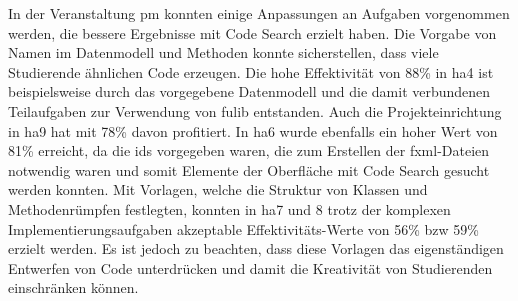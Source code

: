 In der Veranstaltung \ac{pm} konnten einige Anpassungen an Aufgaben vorgenommen werden, die bessere Ergebnisse mit Code Search erzielt haben.
Die Vorgabe von Namen im Datenmodell und Methoden konnte sicherstellen, dass viele Studierende ähnlichen Code erzeugen.
Die hohe Effektivität von 88\% in \ac{ha}4 ist beispielsweise durch das vorgegebene Datenmodell und die damit verbundenen Teilaufgaben zur Verwendung von fulib entstanden.
Auch die Projekteinrichtung in \ac{ha}9 hat mit 78\% davon profitiert.
In \ac{ha}6 wurde ebenfalls ein hoher Wert von 81\% erreicht, da die \acp{id} vorgegeben waren, die zum Erstellen der \ac{fxml}-Dateien notwendig waren und somit Elemente der Oberfläche mit Code Search gesucht werden konnten.
Mit Vorlagen, welche die Struktur von Klassen und Methodenrümpfen festlegten, konnten in \ac{ha}7 und 8 trotz der komplexen Implementierungsaufgaben akzeptable Effektivitäts-Werte von 56\% \ac{bzw} 59\% erzielt werden.
Es ist jedoch zu beachten, dass diese Vorlagen das eigenständigen Entwerfen von Code unterdrücken und damit die Kreativität von Studierenden einschränken können.
